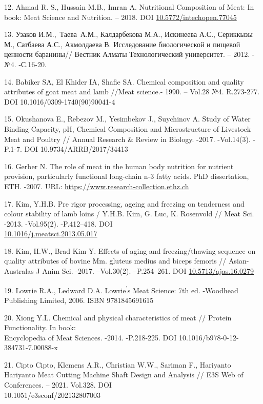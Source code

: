 \begin{references}
12. Ahmad R. S., Hussain M.B., Imran A. Nutritional Composition of Meat:
In book: Meat Science and Nutrition. -- 2018. DOI
\href{http://dx.doi.org/10.5772/intechopen.77045}{10.5772/intechopen.77045}

13. Узаков И.М.,~Таева~А.М., Калдарбекова М.А., Искинеева А.С., Сериккызы
М., Сатбаева А.С., Акмолдаева В. Исследование биологической и пищевой
ценности баранины// Вестник Алматы Технологический университет. --
2012. - №4. -С.16-20.

14. Babiker SA, El Khider IA, Shafie SA. Chemical composition and quality
attributes of goat meat and lamb //Meat science.- 1990. -- Vol.28 №4.
R.273-277. DOI 10.1016/0309-1740(90)90041-4

15. Okushanova E., Rebezov M., Yesimbekov J., Suychinov A. Study of Water
Binding Capacity, pH, Chemical Composition and Microstructure of
Livestock Meat and Poultry // Annual Research \& Review in Biology.
-2017. -Vol.14(3). -P.1-7. DOI 10.9734/ARRB/2017/34413

16. Gerber N. The role of meat in the human body nutrition for nutrient
provision, particularly functional long-chain n-3 fatty acids. PhD
dissertation, ETH. -2007. URL:
\href{https://www.research-collection.ethz.ch/bitstream/handle/20.500.11850/150127/eth-29901-02.pdf}{https://www.research-collection.ethz.ch}

17. Kim, Y.H.B. Pre rigor processing, ageing and freezing on tenderness
and colour stability of lamb loins / Y.H.B. Kim, G. Luc, K. Rosenvold
// Meat Sci. -2013. -Vol.95(2). -P.412--418. DOI\\
\href{http://dx.doi.org/10.1016/j.meatsci.2013.05.017}{10.1016/j.meatsci.2013.05.017}

18. Kim, H.W., Brad Kim Y. Effects of aging and freezing/thawing sequence
on quality attributes of bovine Mm. gluteus medius and biceps femoris
// Asian-Australas J Anim Sci. -2017. --Vol.30(2). --P.254--261. DOI
\href{http://dx.doi.org/10.5713/ajas.16.0279}{10.5713/ajas.16.0279}

19. Lowrie R.A., Ledward D.A. Lowrie\textsuperscript{'{}}s
Meat Science: 7th ed. -Woodhead Publishing Limited, 2006. ISBN
9781845691615

20. Xiong Y.L. Сhemical and physical characteristics of meat // Protein
Functionality. In book: \\Encyclopedia of Meat Sciences. -2014.
-P.218-225. DOI 10.1016/b978-0-12-384731-7.00088-x

21. Cipto Cipto, Klemens A.R., Christian W.W., Sariman F., Hariyanto
Hariyanto Meat Cutting Machine Shaft Design and Analysis // E3S Web of
Conferences. -- 2021. Vol.328. DOI \\10.1051/e3sconf/202132807003


\end{references}
